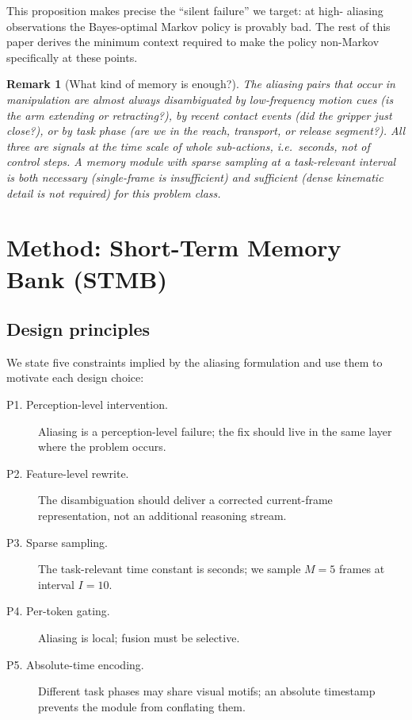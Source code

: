 \documentclass[11pt]{article}
\newtheorem{remark}{Remark}
\begin{document}
This proposition makes precise the ``silent failure'' we target: at high-
aliasing observations the Bayes-optimal Markov policy is provably bad. The rest
of this paper derives the minimum context required to make the policy
non-Markov specifically at these points.

\begin{remark}[What kind of memory is enough?]
The aliasing pairs that occur in manipulation are almost always disambiguated
by \emph{low-frequency motion cues} (is the arm extending or retracting?), by
\emph{recent contact events} (did the gripper just close?), or by \emph{task
phase} (are we in the reach, transport, or release segment?). All three are
signals at the time scale of whole sub-actions, i.e.~seconds, not of control
steps. A memory module with sparse sampling at a task-relevant interval is
both \emph{necessary} (single-frame is insufficient) and \emph{sufficient}
(dense kinematic detail is not required) for this problem class.
\end{remark}

\section{Method: Short-Term Memory Bank (STMB)}
\label{sec:method}

\subsection{Design principles}
\label{sec:principles}

We state five constraints implied by the aliasing formulation and use them to
motivate each design choice:
\begin{description}
    \item[P1. Perception-level intervention.] Aliasing is a perception-level
    failure; the fix should live in the same layer where the problem occurs.
    \item[P2. Feature-level rewrite.] The disambiguation should deliver a
    corrected current-frame representation, not an additional reasoning stream.
    \item[P3. Sparse sampling.] The task-relevant time constant is seconds; we
    sample $M{=}5$ frames at interval $I{=}10$.
    \item[P4. Per-token gating.] Aliasing is local; fusion must be selective.
    \item[P5. Absolute-time encoding.] Different task phases may share visual
    motifs; an absolute timestamp prevents the module from conflating them.
\end{description}
\end{document}
